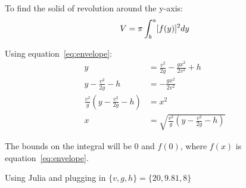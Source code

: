 \documentclass[a4paper,12pt]{article}
\begin{document}
To find the solid of revolution around the y-axis:
\[V = \pi\int^a_b [f(y)]^2 \space dy \]

Using equation~\ref{eq:envelope}:
\begin{align*}
    y  &= \frac{v^2}{2g} - \frac{gx^2}{2v^2} + h \\
    y - \frac{v^2}{2g} - h &= - \frac{gx^2}{2v^2} \\
    \frac{v^2}{g}(y-\frac{v^2}{2g}-h) &= x^2 \\
    x &= \sqrt{\frac{v^2}{g}(y-\frac{v^2}{2g}-h)}
\end{align*}

The bounds on the integral will be \(0\) and \(f(0)\), where \(f(x)\) is equation~\ref{eq:envelope}.

Using Julia and plugging in \(\{v,g, h\} = \{20, 9.81, 8\}\)
\end{document}
